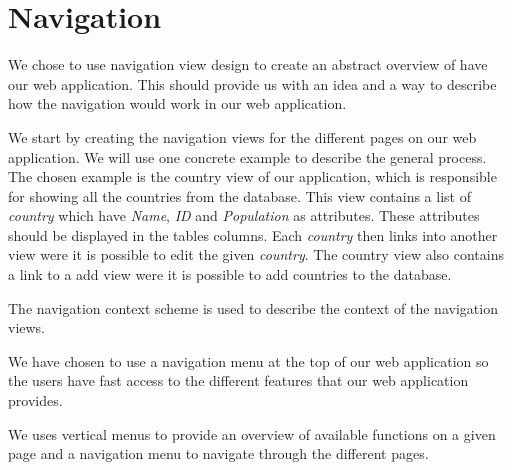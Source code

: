 \section{Navigation}
We chose to use navigation view design to create an abstract overview of have our web application. This should provide us with an idea and a way to describe how the navigation would work in our web application.

We start by creating the navigation views for the different pages on our web application. We will use one concrete example to describe the general process. The chosen example is the country view of our application, which is responsible for showing all the countries from the database. This view contains a list of \textit{country} which have \textit{Name}, \textit{ID} and \textit{Population} as attributes. These attributes should be displayed in the tables columns. Each \textit{country} then links into another view were it is possible to edit the given \textit{country}. The country view also contains a link to a add view were it is possible to add countries to the database.

The navigation context scheme is used to describe the context of the navigation views.

We have chosen to use a navigation menu at the top of our web application so the users have fast access to the different features that our web application provides.

We uses vertical menus to provide an overview of available functions on a given page and a navigation menu to navigate through the different pages.